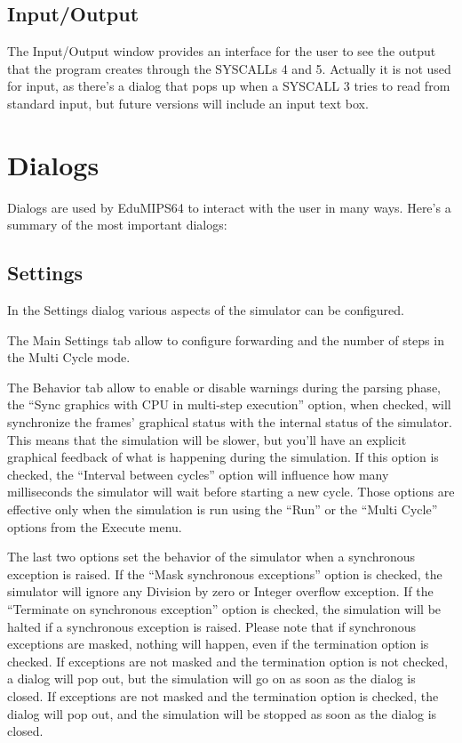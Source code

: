 \documentclass[letterpaper,10pt,english]{sphinxmanual}
\begin{document}
\subsection{Input/Output}
\label{user-interface:input-output}
The Input/Output window provides an interface for the user to see the output
that the program creates through the SYSCALLs 4 and 5. Actually it is not
used for input, as there's a dialog that pops up when a SYSCALL 3 tries to read
from standard input, but future versions will include an input text box.


\section{Dialogs}
\label{user-interface:dialogs}
Dialogs are used by EduMIPS64 to interact with the user in many ways. Here's a
summary of the most important dialogs:


\subsection{Settings}
\label{user-interface:settings}
In the Settings dialog various aspects of the simulator can be configured.

The Main Settings tab allow to configure forwarding and the number of steps in the
Multi Cycle mode.

The Behavior tab allow to enable or disable warnings during the parsing phase,
the ``Sync graphics with CPU in multi-step execution'' option, when checked,
will synchronize the frames' graphical status with the internal status of the
simulator. This means that the simulation will be slower, but you'll have an
explicit graphical feedback of what is happening during the simulation. If this
option is checked, the ``Interval between cycles'' option will influence how
many milliseconds the simulator will wait before starting a new cycle.
Those options are effective only when the simulation is run using the
``Run'' or the ``Multi Cycle'' options from the Execute menu.

The last two options set the behavior of the simulator when a synchronous
exception is raised. If the ``Mask synchronous exceptions'' option is checked,
the simulator will ignore any Division by zero or Integer overflow exception. If
the ``Terminate on synchronous exception'' option is checked, the simulation
will be halted if a synchronous exception is raised. Please note that if
synchronous exceptions are masked, nothing will happen, even if the termination
option is checked. If exceptions are not masked and the termination option is not
checked, a dialog will pop out, but the simulation will go on as soon as the
dialog is closed. If exceptions are not masked and the termination option is
checked, the dialog will pop out, and the simulation will be stopped as soon as
the dialog is closed.
\end{document}
